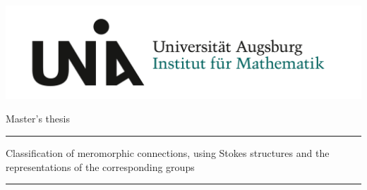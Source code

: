 
\begin{titlepage}
  \thispagestyle{empty}
  \includegraphics[width=\textwidth]{logo/Uni_Aug_Logo_IFM_RGB-crop.png}
  \newcommand{\Rule}{%
    \textcolor{black}{\rule{\textwidth}{0.5mm}}%
  }
  \begin{center}\sffamily
    \normalfont\sffamily\large
    Master's thesis
    \Rule
    \vspace{5mm}
    \Huge{Classification of meromorphic connections, using Stokes structures
    and the representations of the corresponding groups}
    \vspace{1mm}
    \Rule
  \end{center}
  \begin{center}
    \\ \vspace{1cm}
    \\
    \\ \vspace{1cm}
    \\
    \\ \vspace{1cm}
    \makebox[.5\textwidth][l]{\normalfont\sffamily\Large \today}
  \end{center}
  \vfill
  \vfill
\end{titlepage}

